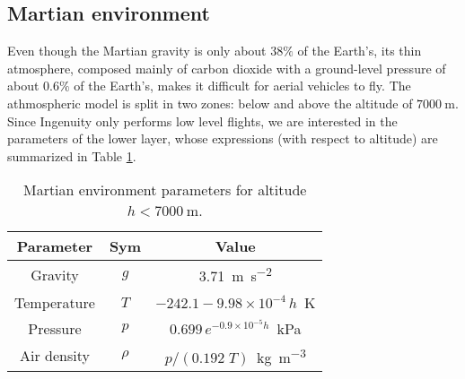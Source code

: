 \subsection{Martian environment}
Even though the Martian gravity is only about $38\%$ of the Earth's, its thin atmosphere, composed mainly of carbon dioxide with a ground-level pressure of about $0.6\%$ of the Earth's, makes it difficult for aerial vehicles to fly. The athmospheric model is split in two zones: below and above the altitude of $\SI{7000}{\meter}$. Since Ingenuity only performs low level flights, we are interested in the parameters of the lower layer, whose expressions (with respect to altitude) are summarized in Table \ref{tab:martian_environment}.

\begin{table}[H]
    \centering
    \begin{tabular}{|c|c|c|}
        \hline
        \textbf{Parameter} & \textbf{Sym} & \textbf{Value} \\
        \hline
        \hline
        Gravity & $g$ & \SI{3.71}{\meter\per\square\second} \\
        \hline
        Temperature & $T$ & $-242.1-9.98 \times 10^{-4} \, h$\;\SI{}{\kelvin} \\
        \hline
        Pressure & $p$ & $0.699 \, e^{-0.9 \times 10^{-5} h}$\;\SI{}{\kilo\pascal} \\
        \hline
        Air density & $\rho$ & $p/(0.192\;T)$\;\SI{}{\kilogram\per\cubic\meter} \\
        \hline
    \end{tabular}
    \caption{Martian environment parameters for altitude $h< \SI{7000}{\meter}$.}
    \label{tab:martian_environment}
\end{table}
